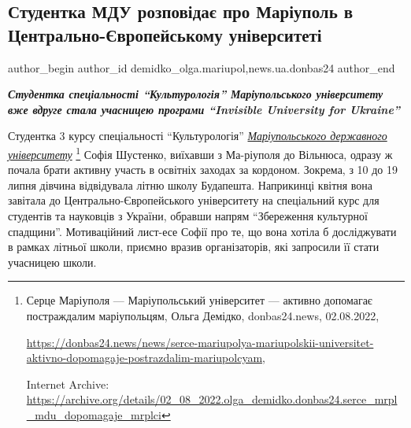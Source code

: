  
 
 
 
 
 
\subsection{Студентка МДУ розповідає про Маріуполь в Центрально-Європейському університеті}
\label{sec:07_11_2022.stz.news.ua.donbas24.1.studentka_mdu_rozpovidaje_mrpl_central_evr_univ}
 
\ifcmt
 author_begin
   author_id demidko_olga.mariupol,news.ua.donbas24
 author_end
\fi

\begin{center}
  \em\color{blue}\bfseries\Large
Студентка спеціальності \enquote{Культурологія} Маріупольського університету вже вдруге
стала учасницею програми \enquote{Invisible University for Ukraine}
\end{center}

Студентка 3 курсу спеціальності \enquote{Культурологія} \href{https://archive.org/details/02_08_2022.olga_demidko.donbas24.serce_mrpl_mdu_dopomagaje_mrplci}{\emph{Маріупольського державного університету}}%
\footnote{Серце Маріуполя — Маріупольський університет — активно допомагає постраждалим маріупольцям, Ольга Демідко, donbas24.news, 02.08.2022, \par%
\url{https://donbas24.news/news/serce-mariupolya-mariupolskii-universitet-aktivno-dopomagaje-postrazdalim-mariupolcyam}, \par%
Internet Archive: \url{https://archive.org/details/02_08_2022.olga_demidko.donbas24.serce_mrpl_mdu_dopomagaje_mrplci}%
} Софія Шустенко, виїхавши з Ма\hyp{}ріуполя до Вільнюса, одразу ж почала
брати активну участь в освітніх заходах за кордоном. Зокрема, з 10 до 19 липня
дівчина відвідувала літню школу Будапешта. Наприкинці квітня вона завітала до
Центрально-Європейського університету на спеціальний курс для студентів та
науковців з України, обравши напрям \enquote{Збереження культурної спадщини}.
Мотиваційний лист-есе Софії про те, що вона хотіла б досліджувати в рамках
літньої школи, приємно вразив організаторів, які запросили її стати учасницею
школи.

